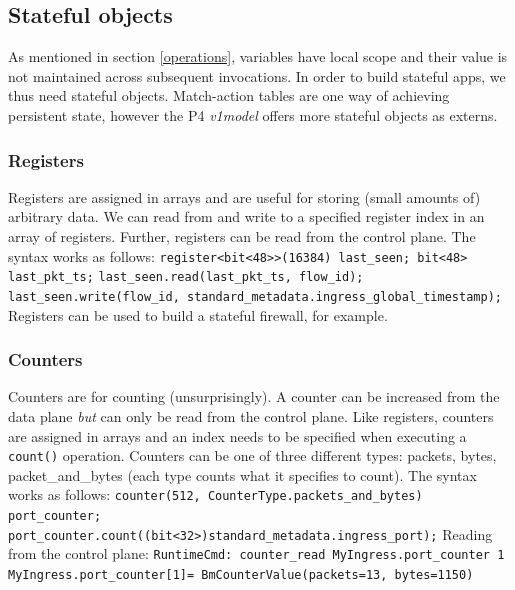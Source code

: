 \documentclass[11pt,oneside,a4paper]{article}
\begin{document}
\subsection{Stateful objects}

As mentioned in section \ref{operations}, variables have local scope and their value is not maintained across subsequent invocations. In order to build stateful apps, we thus need stateful objects. Match-action tables are one way of achieving persistent state, however the P4 \textit{v1model} offers more stateful objects as externs. 

\subsubsection{Registers}

Registers are assigned in arrays and are useful for storing (small amounts of) arbitrary data. We can read from and write to a specified register index in an array of registers. Further, registers can be read from the control plane.
The syntax works as follows:\newline
\indent \texttt{register<bit<48>>(16384) last\_seen; bit<48> last\_pkt\_ts;} \newline
\indent \texttt{last\_seen.read(last\_pkt\_ts, flow\_id);} \newline
\indent \texttt{last\_seen.write(flow\_id, standard\_metadata.ingress\_global\_timestamp);} \newline
\noindent Registers can be used to build a stateful firewall, for example.

\subsubsection{Counters}

Counters are for counting (unsurprisingly). A counter can be increased from the data plane \textit{but} can only be read from the control plane. Like registers, counters are assigned in arrays and an index needs to be specified when executing a \texttt{count()} operation.
Counters can be one of three different types: packets, bytes, packet\_and\_bytes (each type counts what it specifies to count). The syntax works as follows:\newline
\indent \texttt{counter(512, CounterType.packets\_and\_bytes) port\_counter;} \newline
\indent \texttt{port\_counter.count((bit<32>)standard\_metadata.ingress\_port);} \newline
\noindent Reading from the control plane: \newline
\indent \texttt{RuntimeCmd: counter\_read MyIngress.port\_counter 1} \newline
\indent \texttt{MyIngress.port\_counter[1]= BmCounterValue(packets=13, bytes=1150)}
\end{document}
